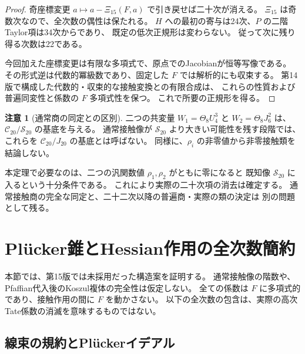 \documentclass[a4paper,11pt]{ltjsarticle}
\theoremstyle{definition}
\newtheorem{remark}[theorem]{注意}
\begin{document}
\begin{proof}
奇座標変更 $a\mapsto a-\Xi_{15}(F,a)$ で引き戻せば二十次が消える。
$\Xi_{15}$ は奇数次なので、全次数の偶性は保たれる。
$H$ への最初の寄与は24次、$P$ の二階Taylor項は34次からであり、
既定の低次正規形は変わらない。
従って次に残り得る次数は22である。

今回加えた座標変更は有限な多項式で、原点でのJacobianが恒等写像である。
その形式逆は代数的冪級数であり、固定した $F$ では解析的にも収束する。
第14版で構成した代数的・収束的な接触変換との有限合成は、
これらの性質および普遍同変性と係数の $F$ 多項式性を保つ。
これで所要の正規形を得る。
\end{proof}

\begin{remark}[通常商の同定との区別]
二つの共変量 $W_1=\Theta_8U_4^3$ と $W_2=\Theta_8J_6^2$ は、
$\mathcal C_{20}/\mathcal S_{20}$ の基底を与える。
通常接触像が $\mathcal S_{20}$ より大きい可能性を残す段階では、
これらを $\mathcal C_{20}/J_{20}$ の基底とは呼ばない。
同様に、$\rho_i$ の非零値から非零接触類を結論しない。

本定理で必要なのは、二つの汎関数値 $\rho_1,\rho_2$ がともに零になると
既知像 $\mathcal S_{20}$ に入るという十分条件である。
これにより実際の二十次項の消去は確定する。
通常接触商の完全な同定と、二十二次以降の普遍商・実際の類の決定は
別の問題として残る。
\end{remark}


\clearpage

\section{Pl\"ucker錐とHessian作用の全次数簡約}
\label{sec:v16-plucker-hessian-structure}

本節では、第15版では未採用だった構造案を証明する。
通常接触像の階数や、Pfaffian代入後のKoszul複体の完全性は仮定しない。
全ての係数は $F$ に多項式的であり、接触作用の間に $F$ を動かさない。
以下の全次数の包含は、実際の高次Tate係数の消滅を意味するものではない。

\subsection{線束の規約とPl\"uckerイデアル}
\end{document}
